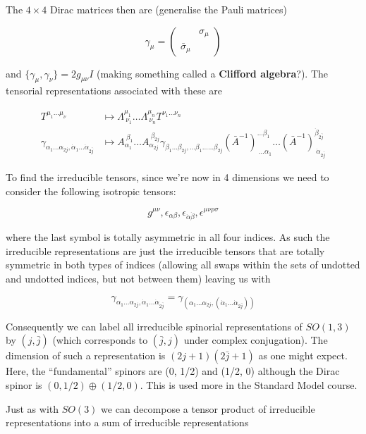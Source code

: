\documentclass{article}
\theoremstyle{definition}
\begin{document}
The $4 \times 4$ Dirac matrices then are (generalise the Pauli matrices)

$$ \gamma_\mu = 
\begin{pmatrix}
& \sigma_\mu \\
\bar{\sigma}_\mu & 
\end{pmatrix} $$

and $\{\gamma_\mu, \gamma_\nu\} = 2g_{\mu \nu} I$ (making something called a
\textbf{Clifford algebra}?). The tensorial representations associated with these
are

\begin{align*}
T^{\mu_1 \dots \mu_\nu} & \mapsto \Lambda^{\mu_1}_{\ \nu_1} \dots \Lambda^{\mu_n}_{\ \nu_n} T^{\nu_1 \dots \nu_n} \\
\gamma_{\alpha_1 \dots \alpha_{2j}, \dot{\alpha}_1 \dots \dot{\alpha}_{2 \bar{j}}} & \mapsto A_{\alpha_1}^{\ \beta_1} \dots A_{\alpha_{2j}}^{\ \beta_{2j}} \gamma_{\beta_1 \dots \beta_{2j}, \dots{\beta}_1 \dots \dots{\beta}_{2j}} (\bar{A}^{-1})^{\dots{\beta}_1}_{\ \dots{\alpha}_1} \dots (\bar{A}^{-1})^{\dot{\beta}_{2\bar{j}}}_{\ \dot{\alpha}_{2 \bar{j}}}
\end{align*}

To find the irreducible tensors, since we're now in 4 dimensions we need to
consider the following isotropic tensors:

$$ g^{\mu \nu}, \epsilon_{\alpha \beta}, \epsilon_{\dot{\alpha} \dot{\beta}},
\epsilon^{\mu \nu \rho \sigma} $$

where the last symbol is totally asymmetric in all four indices. As such the
irreducible representations are just the irreducible tensors that are totally
symmetric in both types of indices (allowing all swaps within the sets of
undotted and undotted indices, but not between them) leaving us with

$$ \gamma_{\alpha_1 \dots \alpha_{2j}, \dot{\alpha}_1 \dots \dot{\alpha}_{2
    \bar{j}}} = \gamma_{(\alpha_1 \dots \alpha_{2j}, (\dot{\alpha}_1 \dots
\dot{\alpha}_{2\bar{j}}))} $$

Consequently we can label all irreducible spinorial representations of $SO(1,
3)$ by $(j, \bar{j})$ (which corresponds to $(\bar{j}, j)$ under complex
conjugation). The dimension of such a representation is $(2j + 1)(2\bar{j} + 1)$
as one might expect. Here, the ``fundamental'' spinors are (0, 1/2) and (1/2, 0)
although the Dirac spinor is $(0, 1/2) \oplus (1/2, 0)$. This is used more in
the Standard Model course.

Just as with $SO(3)$ we can decompose a tensor product of irreducible
representations into a sum of irreducible representations
\end{document}
